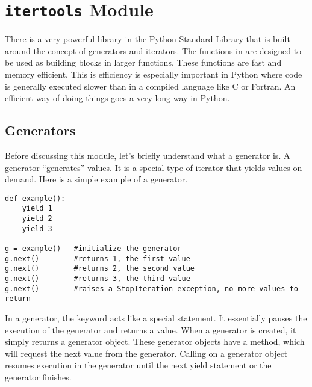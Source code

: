 \section*{\texttt{itertools} Module}
There is a very powerful library in the Python Standard Library that is built around the concept
of generators and iterators.  The functions in  are designed to be used as
building blocks in larger functions.  These functions are fast and memory efficient.
This is efficiency is especially important in Python where code is generally executed slower than in a compiled language like C or Fortran.
An efficient way of doing things goes a very long way in Python.

\subsection*{Generators}
Before discussing this module, let's briefly understand what a generator is.
A generator ``generates'' values.  It is a special type of iterator that yields values on-demand.  Here is a simple example of a generator.
\begin{lstlisting}
def example():
    yield 1
    yield 2
    yield 3
    
g = example()   #initialize the generator
g.next()        #returns 1, the first value
g.next()        #returns 2, the second value
g.next()        #returns 3, the third value
g.next()        #raises a StopIteration exception, no more values to return
\end{lstlisting}
In a generator, the  keyword acts like a special  statement.  
It essentially pauses the execution of the generator and returns a value.
When a generator is created, it simply returns a generator object.
These generator objects have a  method, which will request the next value from the generator.
Calling  on a generator object resumes execution in the generator until the next yield statement or the generator finishes.

